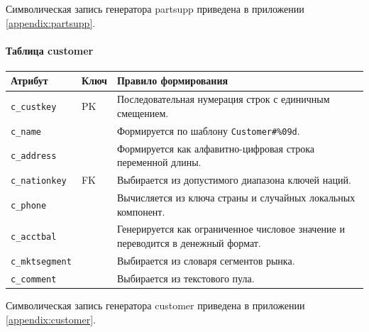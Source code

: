 \noindent Символическая запись генератора partsupp приведена в
приложении \ref{appendix:partsupp}.

\paragraph{Таблица customer}
\begin{center}
\small
\begin{tabular}{|p{}|p{}|p{}|}
\hline
\textbf{Атрибут} & \textbf{Ключ} & \textbf{Правило формирования} \\
\hline
\texttt{c\_custkey} & PK & Последовательная нумерация строк с единичным смещением. \\
\hline
\texttt{c\_name} &  & Формируется по шаблону \texttt{Customer\#\%09d}. \\
\hline
\texttt{c\_address} &  & Формируется как алфавитно-цифровая строка переменной длины. \\
\hline
\texttt{c\_nationkey} & FK & Выбирается из допустимого диапазона ключей наций. \\
\hline
\texttt{c\_phone} &  & Вычисляется из ключа страны и случайных локальных компонент. \\
\hline
\texttt{c\_acctbal} &  & Генерируется как ограниченное числовое значение и переводится в денежный формат. \\
\hline
\texttt{c\_mktsegment} &  & Выбирается из словаря сегментов рынка. \\
\hline
\texttt{c\_comment} &  & Выбирается из текстового пула. \\
\hline
\end{tabular}
\end{center}

\noindent Символическая запись генератора customer приведена в
приложении \ref{appendix:customer}.


